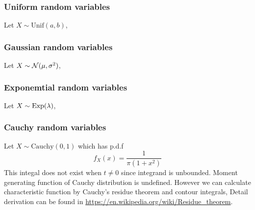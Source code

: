 \subsubsection{Uniform random variables}
Let $X\sim \textrm{Unif}(a,b)$,

\subsubsection{Gaussian random variables}
Let $X\sim \mathcal{N}(\mu, \sigma^2)$,

\subsubsection{Exponemtial random variables}
Let $X\sim \mathrm{Exp}(\lambda)$,

\subsubsection{Cauchy random variables}
Let $X\sim \textrm{Cauchy}(0,1)$ which has p.d.f
$$f_X(x) = \frac{1}{\pi (1+x^2)}$$
This integal does not exist when $t\neq 0$ since integrand is unbounded. Moment generating function of Cauchy distribution is undefined. However we can calculate characteristic function by Cauchy's residue theorem and contour integrals,
Detail derivation can be found in \url{https://en.wikipedia.org/wiki/Residue_theorem}.

